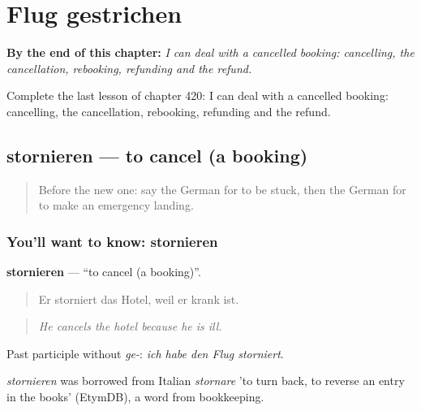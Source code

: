 
\chapter{Flug gestrichen}
\label{ch:ge-flug-gestrichen}

\begin{chapteropening}
\textbf{By the end of this chapter:} \emph{I can deal with a cancelled booking: cancelling, the cancellation, rebooking, refunding and the refund.}

Complete the last lesson of chapter 420: I can deal with a cancelled booking: cancelling, the cancellation, rebooking, refunding and the refund.
\end{chapteropening}

\section[stornieren]{stornieren — to cancel (a booking)}

\label{lesson:GE-C420-stornieren}



\begin{quote}
Before the new one: say the German for to be stuck, then the German for to make an emergency landing.
\end{quote}

\subsection*{You'll want to know: stornieren}
\textbf{stornieren} — \textquotedblleft{}to cancel (a booking)\textquotedblright{}.

\begin{quote}
Er storniert das Hotel, weil er krank ist.
\end{quote}

\begin{quote}
\emph{He cancels the hotel because he is ill.}
\end{quote}

Past participle without \emph{ge-}: \emph{ich habe den Flug storniert}.

\begin{cousinweb}
\emph{stornieren} was borrowed from Italian \emph{stornare} 'to turn back, to reverse an entry in the books' (EtymDB), a word from bookkeeping.
\end{cousinweb}

